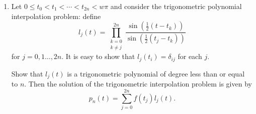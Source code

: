 \documentclass[a4paper,12pt]{article}
\begin{document}
\begin{enumerate}[label = (\arabic*)]
	\newpage
	\item Let $ 0 \leq t_0 < t_1 < \cdots < t_{2n} < w\pi $ and consider the trigonometric polynomial interpolation problem: define
	\[
		l_j(t) = \prod_{\substack{k = 0 \\ k \neq j}}^{2n} \frac{\sin\left(\frac{1}{2} (t - t_k)\right)}{\sin\left(\frac{1}{2} (t_j - t_k)\right)}
	\]
	for $ j = 0, 1 \ldots, 2n $. It is easy to show that $ l_j(t_i) = \delta_{ij} $ for each $ j $.
	
	Show that $ l_j(t) $ is a trigonometric polynomial of degree less than or equal to $ n $. Then the solution of the trigonometric interpolation problem is given by
	\[
		p_n(t) = \sum_{j = 0}^{2n} f(t_j) l_j(t).
	\]
\end{enumerate}
\end{document}
